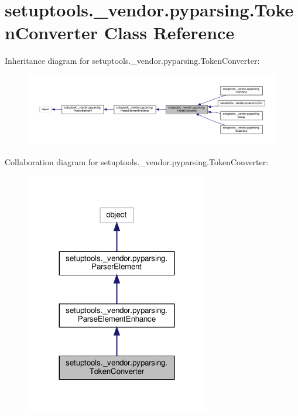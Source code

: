 \hypertarget{classsetuptools_1_1__vendor_1_1pyparsing_1_1TokenConverter}{}\section{setuptools.\+\_\+vendor.\+pyparsing.\+Token\+Converter Class Reference}
\label{classsetuptools_1_1__vendor_1_1pyparsing_1_1TokenConverter}


Inheritance diagram for setuptools.\+\_\+vendor.\+pyparsing.\+Token\+Converter\+:
\nopagebreak
\begin{figure}[H]
\begin{center}
\leavevmode
\includegraphics[width=350pt]{classsetuptools_1_1__vendor_1_1pyparsing_1_1TokenConverter__inherit__graph}
\end{center}
\end{figure}


Collaboration diagram for setuptools.\+\_\+vendor.\+pyparsing.\+Token\+Converter\+:
\nopagebreak
\begin{figure}[H]
\begin{center}
\leavevmode
\includegraphics[width=227pt]{classsetuptools_1_1__vendor_1_1pyparsing_1_1TokenConverter__coll__graph}
\end{center}
\end{figure}
